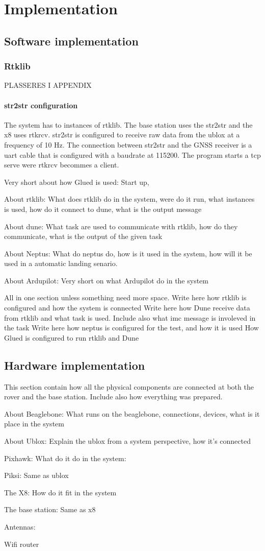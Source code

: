 \chapter{Implementation}

\section{Software implementation}
\subsection{Rtklib}

PLASSERES I APPENDIX
\subsubsection{str2str configuration}
The system has to instances of rtklib. The base station uses the str2str and the x8 uses rtkrcv. str2str is configured to receive raw data from the ublox at a frequency of 10 Hz. The connection between str2str and the GNSS receiver is a uart cable that is configured with a baudrate at 115200. The program starts a tcp serve were rtkrcv becommes a client.

Very short about how Glued is used: Start up, 

About rtklib: What does rtklib do in the system, were do it run, what instances is used, how do it connect to dune, what is the output message

About dune: What task are used to communicate with rtklib, how do they communicate, what is the output of the given task

About Neptus: What do neptus do, how is it used in the system, how will it be used in a automatic landing senario.

About Ardupilot: Very short on what Ardupilot do in the system 



All in one section unless something need more space.
Write here how rtklib is configured and how the system is connected
Write here how Dune receive data from rtklib and what task is used. Include also what imc message is involeved in the task
Write here how neptus is configured for the test, and how it is used
How Glued is configured to run rtklib and Dune
\section{Hardware implementation}
This section contain how all the physical components are connected at both the rover and the base station. Include also how everything was prepared.

About Beaglebone: What runs on the beaglebone, connections, devices, what is it place in the system

About Ublox: Explain the ublox from a system perspective, how it's connected

Pixhawk: What do it do in the system:

Piksi: Same as ublox

The X8: How do it fit in the system

The base station: Same as x8

Antennas: 

Wifi router

